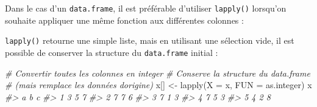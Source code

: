\documentclass[
  french,
]{scrbook}
\newenvironment{Shaded}{\begin{snugshade}}{\end{snugshade}}
\newcommand{\AttributeTok}[1]{\textcolor[rgb]{0.77,0.63,0.00}{#1}}
\newcommand{\CommentTok}[1]{\textcolor[rgb]{0.56,0.35,0.01}{\textit{#1}}}
\newcommand{\FloatTok}[1]{\textcolor[rgb]{0.00,0.00,0.81}{#1}}
\newcommand{\FunctionTok}[1]{\textcolor[rgb]{0.00,0.00,0.00}{#1}}
\newcommand{\NormalTok}[1]{#1}
\newcommand{\OtherTok}[1]{\textcolor[rgb]{0.56,0.35,0.01}{#1}}
\begin{document}
Dans le cas d'un \texttt{data.frame}, il est préférable d'utiliser \texttt{lapply()} lorsqu'on souhaite appliquer une même fonction aux différentes colonnes :

\begin{Shaded}
\end{Shaded}

\texttt{lapply()} retourne une simple liste, mais en utilisant une sélection vide, il est possible de conserver la structure du \texttt{data.frame} initial :

\begin{Shaded}
\begin{Highlighting}[]
\CommentTok{\# Convertir toutes les colonnes en integer}
\CommentTok{\# Conserve la structure du data.frame}
\CommentTok{\# (mais remplace les données d\textquotesingle{}origine)}
\NormalTok{x[] }\OtherTok{\textless{}{-}} \FunctionTok{lapply}\NormalTok{(}\AttributeTok{X =}\NormalTok{ x, }\AttributeTok{FUN =}\NormalTok{ as.integer)}
\NormalTok{x}
\CommentTok{\#\textgreater{}   a b c}
\CommentTok{\#\textgreater{} 1 3 5 7}
\CommentTok{\#\textgreater{} 2 7 7 6}
\CommentTok{\#\textgreater{} 3 7 1 3}
\CommentTok{\#\textgreater{} 4 7 5 3}
\CommentTok{\#\textgreater{} 5 4 2 8}
\end{Highlighting}
\end{Shaded}
\end{document}
